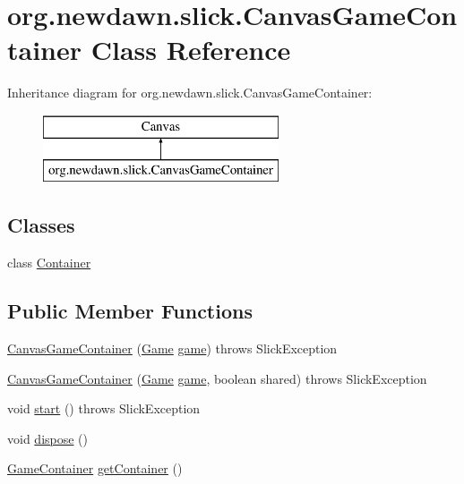 \hypertarget{classorg_1_1newdawn_1_1slick_1_1_canvas_game_container}{}\section{org.\+newdawn.\+slick.\+Canvas\+Game\+Container Class Reference}
\label{classorg_1_1newdawn_1_1slick_1_1_canvas_game_container}
Inheritance diagram for org.\+newdawn.\+slick.\+Canvas\+Game\+Container\+:\begin{figure}[H]
\begin{center}
\leavevmode
\includegraphics[height=2.000000cm]{classorg_1_1newdawn_1_1slick_1_1_canvas_game_container}
\end{center}
\end{figure}
\subsection*{Classes}
\begin{DoxyCompactItemize}
\item 
class \mbox{\hyperlink{classorg_1_1newdawn_1_1slick_1_1_canvas_game_container_1_1_container}{Container}}
\end{DoxyCompactItemize}
\subsection*{Public Member Functions}
\begin{DoxyCompactItemize}
\item 
\mbox{\hyperlink{classorg_1_1newdawn_1_1slick_1_1_canvas_game_container_a078feee2c69d77cabd1f09b87d055923}{Canvas\+Game\+Container}} (\mbox{\hyperlink{interfaceorg_1_1newdawn_1_1slick_1_1_game}{Game}} \mbox{\hyperlink{classorg_1_1newdawn_1_1slick_1_1_canvas_game_container_aea0c3147fede8b9e57819fbee5c50612}{game}})  throws Slick\+Exception 
\item 
\mbox{\hyperlink{classorg_1_1newdawn_1_1slick_1_1_canvas_game_container_a130d50eaef52d7e4cbab1ff365606498}{Canvas\+Game\+Container}} (\mbox{\hyperlink{interfaceorg_1_1newdawn_1_1slick_1_1_game}{Game}} \mbox{\hyperlink{classorg_1_1newdawn_1_1slick_1_1_canvas_game_container_aea0c3147fede8b9e57819fbee5c50612}{game}}, boolean shared)  throws Slick\+Exception 
\item 
void \mbox{\hyperlink{classorg_1_1newdawn_1_1slick_1_1_canvas_game_container_a4649e692eacd83dfb7fe5cf2c383dd39}{start}} ()  throws Slick\+Exception 
\item 
void \mbox{\hyperlink{classorg_1_1newdawn_1_1slick_1_1_canvas_game_container_ab8975a7599bcd4e1080ac578c4ddaa82}{dispose}} ()
\item 
\mbox{\hyperlink{classorg_1_1newdawn_1_1slick_1_1_game_container}{Game\+Container}} \mbox{\hyperlink{classorg_1_1newdawn_1_1slick_1_1_canvas_game_container_a844f6aaba517d2948de205d2f45cd7bc}{get\+Container}} ()
\end{DoxyCompactItemize}
